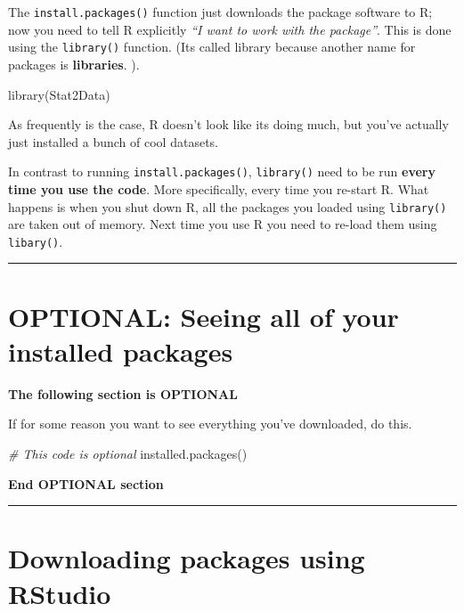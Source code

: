 \documentclass[
]{book}
\newenvironment{Shaded}{\begin{snugshade}}{\end{snugshade}}
\newcommand{\CommentTok}[1]{\textcolor[rgb]{0.56,0.35,0.01}{\textit{#1}}}
\newcommand{\FunctionTok}[1]{\textcolor[rgb]{0.00,0.00,0.00}{#1}}
\newcommand{\NormalTok}[1]{#1}
\begin{document}
The \texttt{install.packages()} function just downloads the package software to R; now you need to tell R explicitly \emph{``I want to work with the package''}. This is done using the \texttt{library()} function. (Its called library because another name for packages is \textbf{libraries}. ).

\begin{Shaded}
\begin{Highlighting}[]
\FunctionTok{library}\NormalTok{(Stat2Data)}
\end{Highlighting}
\end{Shaded}

As frequently is the case, R doesn't look like its doing much, but you've actually just installed a bunch of cool datasets.

In contrast to running \texttt{install.packages()}, \texttt{library()} need to be run \textbf{every time you use the code}. More specifically, every time you re-start R. What happens is when you shut down R, all the packages you loaded using \texttt{library()} are taken out of memory. Next time you use R you need to re-load them using \texttt{libary()}.

\begin{center}\rule{0.5\linewidth}{0.5pt}\end{center}

\hypertarget{optional-seeing-all-of-your-installed-packages}{%
\section{OPTIONAL: Seeing all of your installed packages}\label{optional-seeing-all-of-your-installed-packages}}

\textbf{The following section is OPTIONAL}

If for some reason you want to see everything you've downloaded, do this.

\begin{Shaded}
\begin{Highlighting}[]
\CommentTok{\# This code is optional}
\FunctionTok{installed.packages}\NormalTok{()}
\end{Highlighting}
\end{Shaded}

\textbf{End OPTIONAL section}

\begin{center}\rule{0.5\linewidth}{0.5pt}\end{center}

\hypertarget{downloading-packages-using-rstudio}{%
\section{Downloading packages using RStudio}\label{downloading-packages-using-rstudio}}
\end{document}
